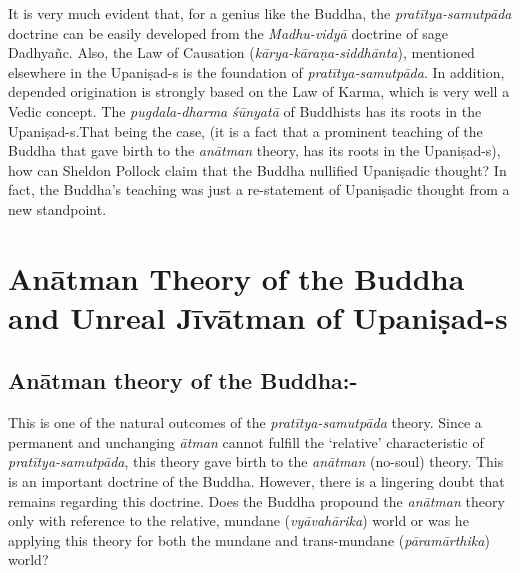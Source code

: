 It is very much evident that, for a genius like the Buddha, the \textit{pratītya-samutpāda} doctrine can be easily developed from the \textit{Madhu-vidyā} doctrine of sage Dadhyañc. Also, the Law of Causation (\textit{kārya-kāraṇa-siddhānta}), mentioned elsewhere in the Upaniṣad-s is the foundation of \textit{pratītya-samutpāda}. In addition, depended origination is strongly based on the Law of Karma, which is very well a Vedic concept. The \textit{pugdala-dharma} \textit{śūnyatā} of Buddhists has its roots in the Upaniṣad-s.\break That being the case, (it is a fact that a prominent teaching of the Buddha that gave birth to the \textit{anātman} theory, has its roots in the Upaniṣad-s), how can Sheldon Pollock claim that the Buddha nullified Upaniṣadic thought? In fact, the Buddha’s teaching was just a re-statement of Upaniṣadic thought from a new standpoint.

\vspace{-.3cm}

\section*{Anātman Theory of the Buddha and Unreal Jīvātman of Upaniṣad-s}

\subsection*{Anātman theory of the Buddha:-}

\vspace{-.3cm}

This is one of the natural outcomes of the \textit{pratītya-samutpāda} theory. Since a permanent and unchanging \textit{ātman} cannot fulfill the ‘relative’ characteristic of \textit{pratītya-samutpāda}, this theory gave birth to the \textit{anātman} (no-soul) theory. This is an important doctrine of the Buddha. However, there is a lingering doubt that remains regarding this doctrine. Does the Buddha propound the \textit{anātman} theory only with reference to the relative, mundane (\textit{vyāvahārika}) world or was he applying this theory for both the mundane and trans-mundane (\textit{pāramārthika}) world?

